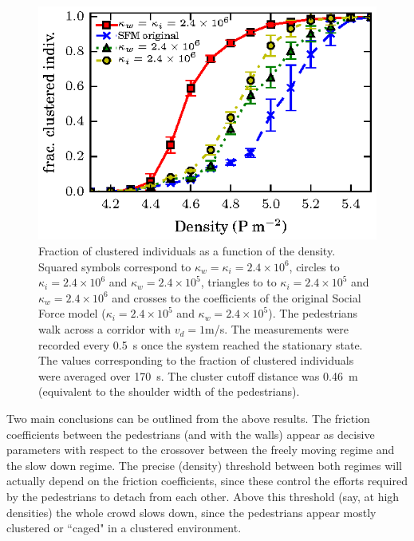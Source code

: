 \begin{figure}[htbp!]
\includegraphics[width=\columnwidth]
{plots/fracc_clusteriz_vs_density.eps}
\caption{\label{fic} Fraction of clustered individuals as a function of the density. Squared symbols correspond to $\kappa_w=\kappa_i=2.4\times 10^6$, circles to $\kappa_i=2.4\times 10^6$ and $\kappa_w=2.4\times 10^5$, triangles to to $\kappa_i=2.4\times 10^5$ and $\kappa_w=2.4\times 10^6$ and crosses to the coefficients of the original Social Force model ($\kappa_i=2.4\times 10^5$ and $\kappa_w=2.4\times 10^5$). The pedestrians walk across a corridor with $v_d=1$m/s. The measurements were recorded every 0.5~s once the system reached the stationary state. The values corresponding to the fraction of clustered individuals were averaged over 170~s. The cluster cutoff distance was 0.46~m (equivalent to the shoulder width of the pedestrians).}
\end{figure}

Two main conclusions can be outlined from the above
results. The friction coefficients between the pedestrians
(and with the walls) appear as decisive parameters
with respect to the crossover between the freely moving
regime and the slow down regime. The precise (density) threshold between both regimes will actually depend on
the friction coefficients, since these control the efforts
required by the pedestrians to detach from each other.
Above this threshold (say, at high densities) the whole
crowd slows down, since the pedestrians appear mostly
clustered or ``caged" in a clustered environment.\\

